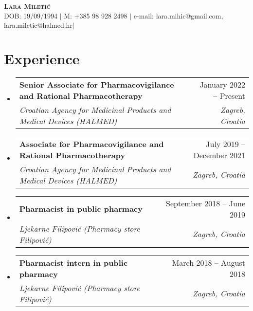 \documentclass[letterpaper,11pt]{article}
\makeatletter
\newcommand{\resumeItem}[1]{
  \item\small{
    {#1 \vspace{-2pt}}
  }
}
\newcommand{\resumeSubheading}[4]{
  \vspace{-2pt}\item
    \begin{tabular*}{0.97\textwidth}[t]{l@{\extracolsep{\fill}}r}
      \textbf{#1} & #2 \\
      \textit{\small#3} & \textit{\small #4} \\
    \end{tabular*}\vspace{-7pt}
}
\newcommand{\resumeSubHeadingListStart}{\begin{itemize}[leftmargin=0.15in, label={}]}
\newcommand{\resumeSubHeadingListEnd}{\end{itemize}}
\newcommand{\resumeItemListStart}{\begin{itemize}}
\newcommand{\resumeItemListEnd}{\end{itemize}\vspace{-5pt}}
\makeatother
\begin{document}
\begin{center}
    \textbf{\Huge \scshape Lara Miletić} \\ \vspace{1pt}
    \small DOB: 19/09/1994 $|$
    \small M: +385 98 928 2498 $|${ e-mail: lara.mihic@gmail.com, lara.miletic@halmed.hr}$|$

\end{center}
\section{{Experience}}
  \resumeSubHeadingListStart
      \resumeSubheading
      {{Senior Associate for Pharmacovigilance and Rational Pharmacotherapy}}{January 2022 -- Present}
      {Croatian Agency for Medicinal Products and Medical Devices (HALMED)}{Zagreb, Croatia}

    \resumeSubheading
      {{Associate for Pharmacovigilance and Rational Pharmacotherapy}}{July 2019 -- December 2021}
      {Croatian Agency for Medicinal Products and Medical Devices (HALMED)}{Zagreb, Croatia}
    
     \resumeSubheading
      {{Pharmacist in public pharmacy}}{September 2018 -- June 2019}
      {Ljekarne Filipović (Pharmacy store Filipović)}{Zagreb, Croatia}
      \resumeSubheading
      {{Pharmacist intern in public pharmacy}}{March 2018 -- August 2018}
      {Ljekarne Filipović (Pharmacy store Filipović)}{Zagreb, Croatia}
  \resumeSubHeadingListEnd
\end{document}

